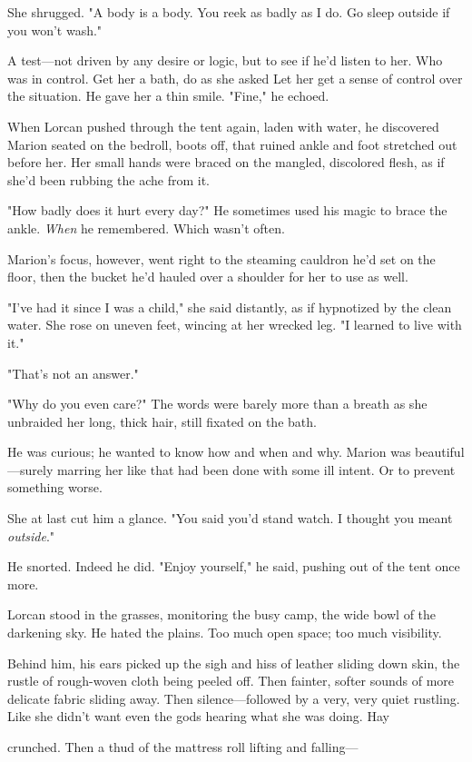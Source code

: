 She shrugged. "A body is a body. You reek as badly as I do. Go sleep outside if you won't wash."

A test---not driven by any desire or logic, but  to see if he'd listen to her. Who was in control. Get her a bath, do as she asked
 Let her get a sense of control over the situation. He gave her a thin smile. "Fine," he echoed.

When Lorcan pushed through the tent again, laden with water, he discovered Marion seated on the bedroll, boots off, that ruined ankle and foot stretched out before her. Her small hands were braced on the mangled, discolored flesh, as if she'd been rubbing the ache from it.

"How badly does it hurt every day?" He sometimes used his magic to brace the ankle. \emph{When} he remembered. Which wasn't often.

Marion's focus, however, went right to the steaming cauldron he'd set on the floor, then the bucket he'd hauled over a shoulder for her to use as well.

"I've had it since I was a child," she said distantly, as if hypnotized by the clean water. She rose on uneven feet, wincing at her wrecked leg. "I learned to live with it."

"That's not an answer."

"Why do you even care?" The words were barely more than a breath as she unbraided her long, thick hair, still fixated on the bath.

He was curious; he wanted to know how and when and why. Marion was beautiful---surely marring her like that had been done with some ill intent. Or to prevent something worse.

She at last cut him a glance. "You said you'd stand watch. I thought you meant \emph{outside}."

He snorted. Indeed he did. "Enjoy yourself," he said, pushing out of the tent once more.

Lorcan stood in the grasses, monitoring the busy camp, the wide bowl of the darkening sky. He hated the plains. Too much open space; too much visibility.

Behind him, his ears picked up the sigh and hiss of leather sliding down skin, the rustle of rough-woven cloth being peeled off. Then fainter, softer sounds of more delicate fabric sliding away. Then silence---followed by a very, very quiet rustling. Like she didn't want even the gods hearing what she was doing. Hay

crunched. Then a thud of the mattress roll lifting and falling---

